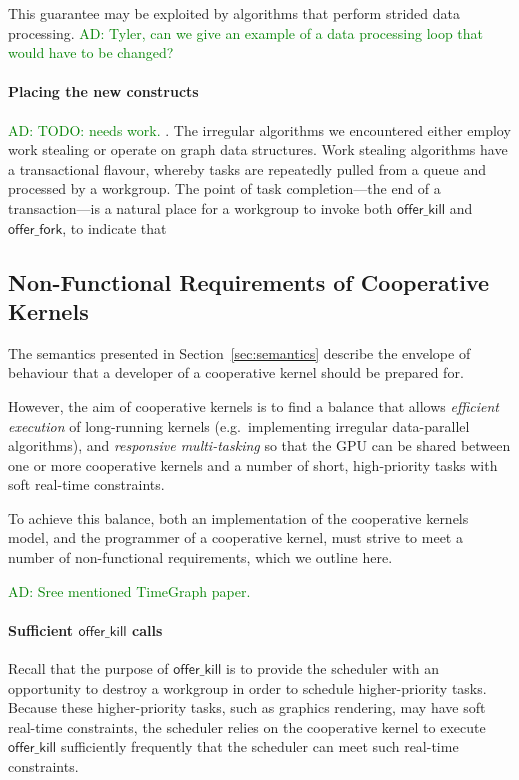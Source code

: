 \documentclass[nocopyrightspace]{sigplanconf-pldi16}
\newcommand{\ADComment}[1]{\textcolor{green}{AD: #1}}
\newcommand{\offerfork}{\mathsf{offer\_fork}}
\newcommand{\offerkill}{\mathsf{offer\_kill}}
\begin{document}
This guarantee may be exploited by algorithms that perform strided data
processing.  \ADComment{Tyler, can we give an example of a data
  processing loop that would have to be changed?}

\paragraph{Placing the new constructs}

\ADComment{TODO: needs work.}
.  The irregular
algorithms we encountered either employ work stealing or operate on
graph data structures.  Work stealing algorithms have a transactional
flavour, whereby tasks are repeatedly pulled from a queue and
processed by a workgroup.  The point of task completion---the end of a transaction---is a natural place for a workgroup to invoke both $\offerkill$ and $\offerfork$, to indicate that 



\subsection{Non-Functional Requirements of Cooperative Kernels}\label{sec:nonfunctional}

The semantics presented in Section~\ref{sec:semantics} describe the envelope of
behaviour that a developer of a cooperative kernel should be prepared
for.

However, the aim of cooperative kernels is to find a balance that
allows \emph{efficient execution} of long-running kernels
(e.g.\ implementing irregular data-parallel algorithms), and
\emph{responsive multi-tasking} so that the GPU can be shared between
one or more cooperative kernels and a number of short, high-priority
tasks with soft real-time constraints.

To achieve this balance, both an implementation of the cooperative
kernels model, and the programmer of a cooperative kernel, must strive
to meet a number of non-functional requirements, which we outline
here.

\ADComment{Sree mentioned TimeGraph paper.}

\paragraph{Sufficient $\offerkill$ calls}

Recall that the purpose of $\offerkill$ is to provide the scheduler
with an opportunity to destroy a workgroup in order to schedule
higher-priority tasks.  Because these higher-priority tasks, such as
graphics rendering, may have soft real-time constraints, the scheduler
relies on the cooperative kernel to execute $\offerkill$ sufficiently
frequently that the scheduler can meet such real-time constraints.
\end{document}
